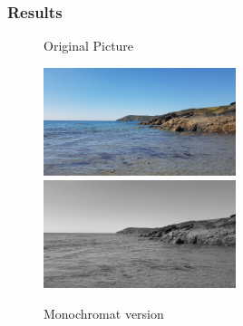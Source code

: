 \documentclass{Report}
\begin{document}
\newpage

\subsubsection{Results}
\begin{figure}[h!]
  \centering
  \caption{Original Picture}
  \includegraphics[width=0.5\textwidth]{Lizard}
  \centering
  \includegraphics[width=0.5\textwidth]{./ColourBlindness/Monochromat/Monochromat.jpg}
  \caption{Monochromat version}
\end{figure}

\newpage

\printbibliography
\end{document}
